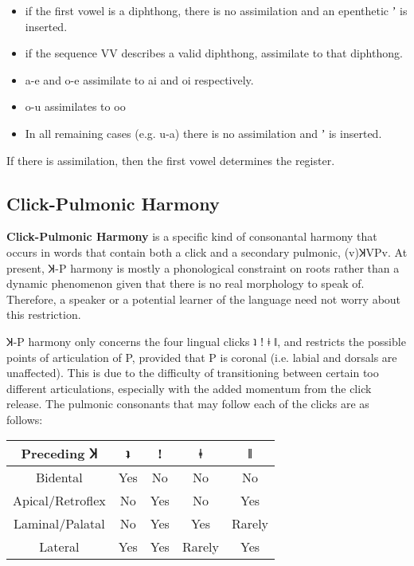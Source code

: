 \documentclass[11pt,a5paper]{book}
\newcommand{\qcn}[1]{\textcolor{AccentText}{\large#1}}
\begin{document}
\begin{itemize}
\item if the first vowel is a diphthong, there is no assimilation and an epenthetic \qcn{ʼ} is inserted.
\item if the sequence VV describes a valid diphthong, assimilate to that diphthong.
\item \qcn{a-e} and \qcn{o-e} assimilate to \qcn{ai} and \qcn{oi} respectively.
\item \qcn{o-u} assimilates to \qcn{oo}
\item In all remaining cases (e.g. \qcn{u-a}) there is no assimilation and \qcn{ʼ} is inserted.
\end{itemize}

If there is assimilation, then the first vowel determines the register.

\subsection{Click-Pulmonic Harmony}

\textbf{Click-Pulmonic Harmony} is a specific kind of consonantal harmony that occurs in words that contain both a click and a secondary pulmonic, (v)ꞰVPv. At present, Ʞ-P harmony is mostly a phonological constraint on roots rather than a dynamic phenomenon given that there is no real morphology to speak of. Therefore, a speaker or a potential learner of the language need not worry about this restriction.

Ʞ-P harmony only concerns the four lingual clicks \qcn{ʇ ǃ ǂ ǁ}, and restricts the possible points of articulation of P, provided that P is coronal (i.e. labial and dorsals are unaffected). This is due to the difficulty of transitioning between certain too different articulations, especially with the added momentum from the click release. The pulmonic consonants that may follow each of the clicks are as follows:

\begin{center}
\begin{tabular}{|c|c|c|c|c|}
\hline
Preceding Ʞ & \qcn{ʇ} & \qcn{ǃ} & \qcn{ǂ} & \qcn{ǁ} \\ \hline \hline
Bidental & Yes & No & No & No \\\hline
Apical/Retroflex & No & Yes & No & Yes \\\hline
Laminal/Palatal & No & Yes & Yes & Rarely \\\hline
Lateral & Yes & Yes & Rarely & Yes \\ \hline
\end{tabular}
\end{center}
\end{document}
